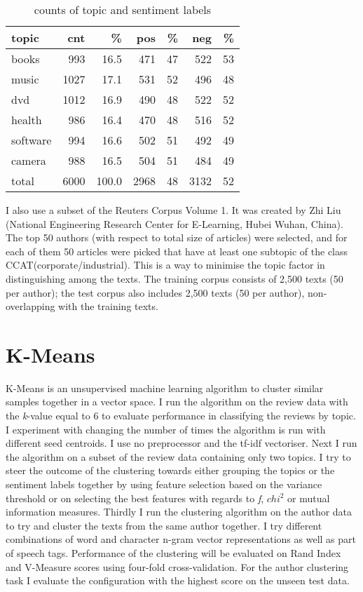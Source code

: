 \documentclass[11pt]{article}
\begin{document}
\begin{table}[ht]\footnotesize
\caption{counts of topic and sentiment labels}
\label{tab:corpus}
\begin{tabular}{ l r r r r r r }
topic & cnt & \% & pos & \% & neg & \% \\
\hline
books & 993 & 16.5 & 471 & 47 & 522 & 53 \\
music & 1027 & 17.1 & 531 & 52 & 496 & 48 \\
dvd & 1012 & 16.9 & 490 & 48 & 522 & 52 \\
health & 986 & 16.4 & 470 & 48 & 516 & 52 \\
software & 994 & 16.6 & 502 & 51 & 492 & 49 \\
camera & 988 & 16.5 & 504 & 51 & 484 & 49 \\
\hline
total & 6000 & 100.0 & 2968 & 48 & 3132 & 52 \\
\end{tabular}

\end{table}

I also use a subset of the Reuters Corpus Volume 1. It was created by Zhi Liu (National Engineering Research Center for E-Learning, Hubei Wuhan, China). The top 50 authors (with respect to total size of articles) were selected, and for each of them 50 articles were picked that have at least one subtopic of the class CCAT(corporate/industrial). This is a way to minimise the topic factor in distinguishing among the texts. The training corpus consists of 2,500 texts (50 per author); the test corpus also includes 2,500 texts (50 per author), non-overlapping with the training texts.

\section{K-Means}

K-Means is an unsupervised machine learning algorithm to cluster similar samples together in a vector space. I run the algorithm on the review data with the \emph{k}-value equal to 6 to evaluate performance in classifying the reviews by topic. I experiment with changing the number of times the algorithm is run with different seed centroids. I use no preprocessor and the tf-idf vectoriser. Next I run the algorithm on a subset of the review data containing only two topics. I try to steer the outcome of the clustering towards either grouping the topics or the sentiment labels together by using feature selection based on the variance threshold or on selecting the best features with regards to \emph{f}, \emph{$chi^2$} or mutual information measures. Thirdly I run the clustering algorithm on the author data to try and cluster the texts from the same author together. I try different combinations of word and character n-gram vector representations as well as part of speech tags. Performance of the clustering will be evaluated on Rand Index and V-Measure scores using four-fold cross-validation. For the author clustering task I evaluate the configuration with the highest score on the unseen test data.
\end{document}
